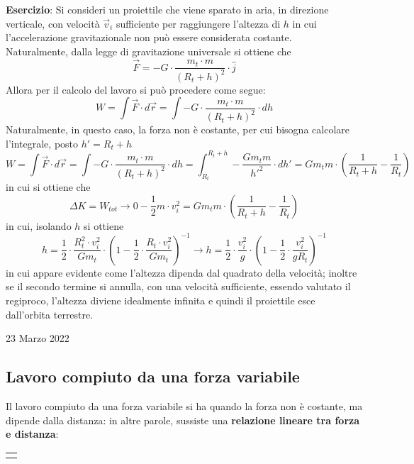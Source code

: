 \documentclass[a4paper]{extarticle}
\begin{document}
\vspace{1em}
\noindent
\textbf{Esercizio}: Si consideri un proiettile che viene sparato in aria, in direzione verticale, con velocità $\vec v_i$ sufficiente per raggiungere l'altezza di $h$ in cui l'accelerazione gravitazionale non può essere considerata costante.\\
Naturalmente, dalla legge di gravitazione universale si ottiene che
\[\vec F = - G \cdot \frac{m_t \cdot m}{(R_t + h)^2} \cdot \hat{j}\]
Allora per il calcolo del lavoro si può procedere come segue:
\[W=\int \vec F \cdot d \vec r = \int -G \cdot \frac{m_t \cdot m}{(R_t + h)^2} \cdot dh\]
Naturalmente, in questo caso, la forza non è costante, per cui bisogna calcolare l'integrale, posto $h'=R_t+h$
\[W=\int \vec F \cdot d \vec r = \int -G \cdot \frac{m_t \cdot m}{(R_t + h)^2} \cdot dh = \int_{R_t}^{R_t+h} - \frac{G m_t m}{{h'}^2} \cdot dh' = G m_t m \cdot \left(\frac{1}{R_t+h}-\frac{1}{R_t}\right)\]
in cui si ottiene che
\[\Delta K = W_{tot} \longrightarrow 0 - \frac{1}{2}m \cdot v_i^2 = G m_t m \cdot \left(\frac{1}{R_t+h}-\frac{1}{R_t}\right)\]
in cui, isolando $h$ si ottiene
\[h = \frac{1}{2} \cdot \frac{R_t^2 \cdot v_i^2}{G m_t} \cdot \left(1 - \frac{1}{2} \cdot \frac{R_t \cdot v_i^2}{G m_t} \right)^{-1} \longrightarrow h = \frac{1}{2} \cdot \frac{v_i^2}{g} \cdot \left(1 - \frac{1}{2} \cdot \frac{v_i^2}{g R_t} \right)^{-1}\]
in cui appare evidente come l'altezza dipenda dal quadrato della velocità; inoltre se il secondo termine si annulla, con una velocità sufficiente, essendo valutato il regiproco, l'altezza diviene idealmente infinita e quindi il proiettile esce dall'orbita terrestre.

\newpage
\noindent
\begin{center}
  23 Marzo 2022
\end{center}
\subsection{Lavoro compiuto da una forza variabile}
Il lavoro compiuto da una forza variabile si ha quando la forza non è costante, ma dipende dalla distanza: in altre parole, sussiste una \textbf{relazione lineare tra forza e distanza}:


\vspace{2em}
\noindent
{}
\begin{tabularx}{\textwidth}{P}
  {
      \centering
    }
\end{tabularx}
\end{document}
